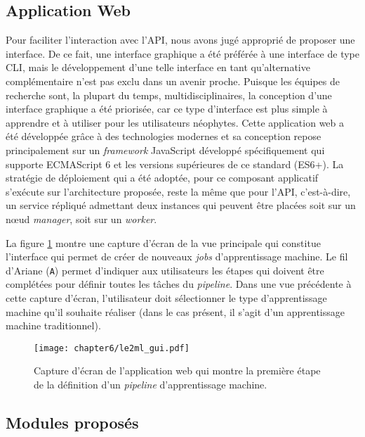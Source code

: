 \subsection{Application Web}

Pour faciliter l'interaction avec l'\acs{API}, nous avons jugé approprié de proposer une interface. De ce fait, une interface graphique a été préférée à une interface de type \acs{CLI}, mais le développement d'une telle interface en tant qu'alternative complémentaire n'est pas exclu dans un avenir proche. Puisque les équipes de recherche sont, la plupart du temps, multidisciplinaires, la conception d'une interface graphique a été priorisée, car ce type d'interface est plus simple à apprendre et à utiliser pour les utilisateurs néophytes. Cette application web a été développée grâce à des technologies modernes et sa conception repose principalement sur un \textit{framework} JavaScript développé spécifiquement qui supporte ECMAScript 6 et les versions supérieures de ce standard (ES6+). La stratégie de déploiement qui a été adoptée, pour ce composant applicatif s'exécute sur l'architecture proposée, reste la même que pour l'\acs{API}, c'est-à-dire, un service répliqué admettant deux instances qui peuvent être placées soit sur un n\oe{}ud \textit{manager}, soit sur un \textit{worker}.

La figure \ref{fig:le2ml_gui} montre une capture d'écran de la vue principale qui constitue l'interface qui permet de créer de nouveaux \textit{jobs} d'apprentissage machine. Le fil d'Ariane (\texttt{A}) permet d'indiquer aux utilisateurs les étapes qui doivent être complétées pour définir toutes les tâches du \textit{pipeline}. Dans une vue précédente à cette capture d'écran, l'utilisateur doit sélectionner le type d'apprentissage machine qu'il souhaite réaliser (dans le cas présent, il s'agit d'un apprentissage machine traditionnel).

\begin{figure}[H]
	\centering
	\texttt{[image: chapter6/le2ml\_gui.pdf]}
        \caption{Capture d'écran de l'application web qui montre la première étape de la définition d'un \textit{pipeline} d'apprentissage machine.}
	\label{fig:le2ml_gui}
\end{figure}

\subsection{Modules proposés}

